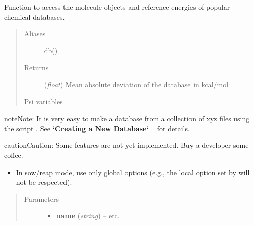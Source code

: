 \documentclass[letterpaper,10pt,english]{sphinxmanual}
\begin{document}
\begin{fulllineitems}
\label{db:wrappers.database}
Function to access the molecule objects and reference energies of
popular chemical databases.
\begin{quote}\begin{description}
\item[{Aliases }] \leavevmode
db()

\item[{Returns}] \leavevmode
(\emph{float}) Mean absolute deviation of the database in kcal/mol

\item[{Psi variables}] \leavevmode
\end{description}\end{quote}

\begin{fulllineitems}
\label{db:envvar-db_nameDATABASEMEANSIGNEDDEVIATION}\label{db:envvar-db_nameDATABASEMEANABSOLUTEDEVIATION}\label{db:envvar-db_nameDATABASEROOT-MEAN-SQUAREDEVIATION}
\end{fulllineitems}


\begin{notice}{note}{Note:}
It is very easy to make a database from a collection of xyz files
using the script .
See {\color{red}\bfseries{}{}`Creating a New Database{}`\_} for details.
\end{notice}

\begin{notice}{caution}{Caution:}
Some features are not yet implemented. Buy a developer some coffee.
\begin{itemize}
\item {} 
In sow/reap mode, use only global options (e.g., the local option set by  will not be respected).

\end{itemize}
\end{notice}
\begin{quote}\begin{description}
\item[{Parameters}] \leavevmode\begin{itemize}
\item {} 
\textbf{name} (\emph{string}) -- 
 \textbar{}\textbar{}  \textbar{}\textbar{}  \textbar{}\textbar{} etc.


\end{itemize}
\end{description}
\end{quote}
\end{fulllineitems}
\end{document}
